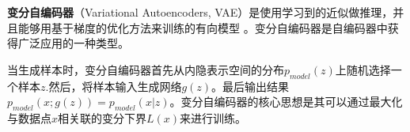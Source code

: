 

\textbf{变分自编码器}（Variational Autoencoders, VAE）是使用学习到的近似做推理，并且能够用基于梯度的优化方法来训练的有向模型 \cite{GDL}。变分自编码器是自编码器中获得广泛应用的一种类型。

当生成样本时，变分自编码器首先从内隐表示空间的分布$p_{model}(z)$上随机选择一个样本$z$.然后，将样本输入生成网络$g(z)$。最后输出结果$p_{model}(x;g(z))=p_{model}(x|z)$。变分自编码器的核心思想是其可以通过最大化与数据点$x$相关联的变分下界$L(x)$来进行训练。

